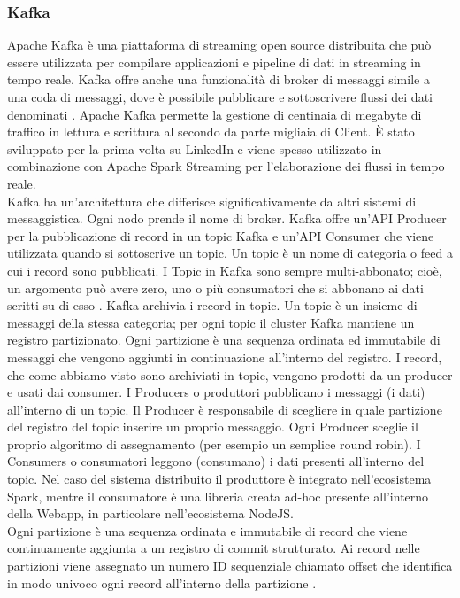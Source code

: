 \subsubsection{Kafka}
\label{sec:kafka}
Apache Kafka è una piattaforma di streaming open source distribuita che può essere utilizzata per compilare applicazioni e pipeline di dati in streaming in tempo reale. Kafka offre anche una funzionalità di broker di messaggi simile a una coda di messaggi, dove è possibile pubblicare e sottoscrivere flussi dei dati denominati \cite{kafka:microsoft}. Apache Kafka permette la gestione di centinaia di megabyte di traffico in lettura e scrittura al secondo da parte migliaia di Client. È stato sviluppato per la prima volta su LinkedIn e viene spesso utilizzato in combinazione con Apache Spark Streaming per l'elaborazione dei flussi in tempo reale.
\\Kafka ha un'architettura che differisce significativamente da altri sistemi di messaggistica. Ogni nodo prende il nome di broker. Kafka offre un'API Producer per la pubblicazione di record in un topic Kafka e un’API Consumer che viene utilizzata quando si sottoscrive un topic. Un topic è un nome di categoria o feed a cui i record sono pubblicati. I Topic in Kafka sono sempre multi-abbonato; cioè, un argomento può avere zero, uno o più consumatori che si abbonano ai dati scritti su di esso \cite{kafka:home}. Kafka archivia i record in topic. Un topic è un insieme di messaggi della stessa categoria; per ogni topic il cluster Kafka mantiene un registro partizionato. Ogni partizione è una sequenza ordinata ed immutabile di messaggi che vengono aggiunti in continuazione all’interno del registro. I record, che come abbiamo visto sono archiviati in topic, vengono prodotti da un producer e usati dai consumer. I Producers o produttori pubblicano i messaggi (i dati) all’interno di un topic. Il Producer è responsabile di scegliere in quale partizione del registro del topic inserire un proprio messaggio. Ogni Producer sceglie il proprio algoritmo di assegnamento (per esempio un semplice round robin). I Consumers o consumatori leggono (consumano) i dati presenti all’interno del topic. Nel caso del sistema distribuito il produttore è integrato nell'ecosistema Spark, mentre il consumatore è una libreria creata ad-hoc presente all'interno della Webapp, in particolare nell'ecosistema NodeJS. 
\\Ogni partizione è una sequenza ordinata e immutabile di record che viene continuamente aggiunta a un registro di commit strutturato. Ai record nelle partizioni viene assegnato un numero ID sequenziale chiamato offset che identifica in modo univoco ogni record all'interno della partizione \cite{kafka:home}.
